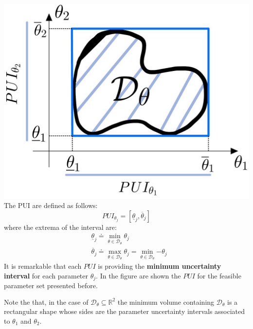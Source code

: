 \begin{multicols}{2}
    \includegraphics[scale=0.18]{img/PUI_1.jpeg}
    The PUI are defined as follows:
    \begin{equation}
        PUI_{\theta_j} = [\underline{\theta}_j,
        \overline{\theta}_j]
    \end{equation}
    where the extrema of the interval are:
    \begin{align}
        &\underline{\theta}_j \doteq \min_{\theta\in\mathcal{D}_\theta} {\theta_j}\\
        &\overline{\theta}_j \doteq \max_{\theta\in\mathcal{D}_\theta} {\theta_j} = \min_{\theta\in\mathcal{D}_\theta}{-\theta_j}
    \end{align}
    It is remarkable that each $PUI$ is providing the \textbf{minimum uncertainty interval} for each parameter $\theta_j$. In the figure are shown the $PUI$ for the feasible parameter set presented before.
\end{multicols}
\noindent 
Note the that, in the case of $\mathcal{D}_\theta \subseteq \mathbb{R}^2$ the minimum volume containing $\mathcal{D}_\theta$ is a rectangular shape whose sides are the parameter uncertainty intervals associated to $\theta_1$ and $\theta_2$.

